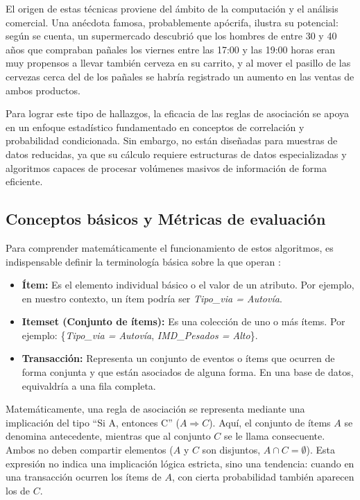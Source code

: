 \documentclass[twoside,a4paper,12pt,onecolumn,openany]{book}
\begin{document}
\vspace{0.5cm}

El origen de estas técnicas proviene del ámbito de la computación y el análisis comercial. Una anécdota famosa, probablemente apócrifa, ilustra su potencial: según se cuenta, un supermercado descubrió que los hombres de entre 30 y 40 años que compraban pañales los viernes entre las 17:00 y las 19:00 horas eran muy propensos a llevar también cerveza en su carrito, y al mover el pasillo de las cervezas cerca del de los pañales se habría registrado un aumento en las ventas de ambos productos.

\vspace{0.5cm}

Para lograr este tipo de hallazgos, la eficacia de las reglas de asociación se apoya en un enfoque estadístico fundamentado en conceptos de correlación y probabilidad condicionada. Sin embargo, no están diseñadas para muestras de datos reducidas, ya que su cálculo requiere estructuras de datos especializadas y algoritmos capaces de procesar volúmenes masivos de información de forma eficiente.

\subsection{Conceptos básicos y Métricas de evaluación}

Para comprender matemáticamente el funcionamiento de estos algoritmos, es indispensable definir la terminología básica sobre la que operan \cite{apuntes_teoria2025}:

\begin{itemize}
    \item \textbf{Ítem:} Es el elemento individual básico o el valor de un atributo. Por ejemplo, en nuestro contexto, un ítem podría ser \textit{Tipo\_via = Autovía}.
    
    \item \textbf{Itemset (Conjunto de ítems):} Es una colección de uno o más ítems. Por ejemplo: \{\textit{Tipo\_via = Autovía}, \textit{IMD\_Pesados = Alto}\}.
    
    \item \textbf{Transacción:} Representa un conjunto de eventos o ítems que ocurren de forma conjunta y que están asociados de alguna forma. En una base de datos, equivaldría a una fila completa.
\end{itemize}

Matemáticamente, una regla de asociación se representa mediante una implicación del tipo ``Si A, entonces C'' ($A \Rightarrow C$). Aquí, el conjunto de ítems $A$ se denomina antecedente, mientras que al conjunto $C$ se le llama consecuente. Ambos no deben compartir elementos ($A$ y $C$ son disjuntos, $A \cap C = \emptyset$). Esta expresión no indica una implicación lógica estricta, sino una tendencia: cuando en una transacción ocurren los ítems de $A$, con cierta probabilidad también aparecen los de $C$.
\end{document}
